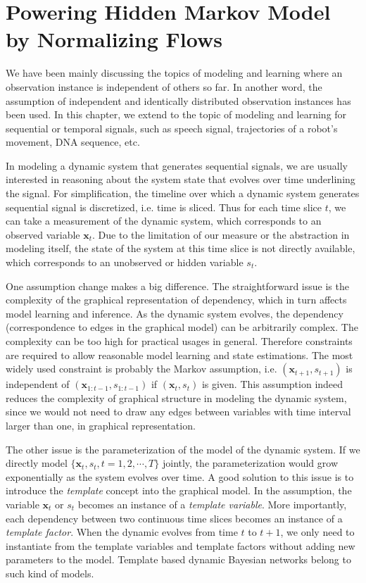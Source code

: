 \chapter{Powering Hidden Markov Model by Normalizing Flows}
\label{chpt7:genhmm}
We have been mainly discussing the topics of modeling and learning where an observation instance is independent of others so far. In another word, the assumption of independent and identically distributed observation instances has been used. In this chapter, we extend to the topic of modeling and learning for sequential or temporal signals, such as speech signal, trajectories of a robot's movement, DNA sequence, etc.

In modeling a dynamic system that generates sequential signals, we are usually interested in reasoning about the system state that evolves over time underlining the signal. For simplification, the timeline over which a dynamic system generates sequential signal is discretized, i.e. time is sliced. Thus for each time slice $t$, we can take a measurement of the dynamic system, which corresponds to an observed variable $\bm{x}_t$. Due to the limitation of our measure or the abstraction in modeling itself, the state of the system at this time slice is not directly available, which corresponds to an unobserved or hidden variable $s_t$.

One assumption change makes a big difference. The straightforward issue is the complexity of the graphical representation of dependency, which in turn affects model learning and inference. As the dynamic system evolves, the dependency (correspondence to edges in the graphical model) can be arbitrarily complex. The complexity can be too high for practical usages in general. Therefore constraints are required to allow reasonable model learning and state estimations.
The most widely used constraint is probably the Markov assumption, i.e. $(\bm{x}_{t+1}, {s}_{t+1})$ is independent of $(\bm{x}_{1:t-1}, {s}_{1:t-1})$ if $(\bm{x}_{t}, {s}_{t})$ is given. This assumption indeed reduces the complexity of graphical structure in modeling the dynamic system, since we would not need to draw any edges between variables with time interval larger than one, in graphical representation.

The other issue is the parameterization of the model of the dynamic system. If we directly model $\{\bm{x}_t, {s}_t, t=1, 2, \cdots, T\}$ jointly, the parameterization would grow exponentially as the system evolves over time. A good solution to this issue is to introduce the \textit{template} concept into the graphical model. In the assumption, the variable $\bm{x}_t$ or $s_t$ becomes an instance of a \textit{template variable}. More importantly, each dependency between two continuous time slices becomes an instance of a \textit{template factor}. When the dynamic evolves from time $t$ to $t+1$, we only need to instantiate from the template variables and template factors without adding new parameters to the model. Template based dynamic Bayesian networks belong to such kind of models.

